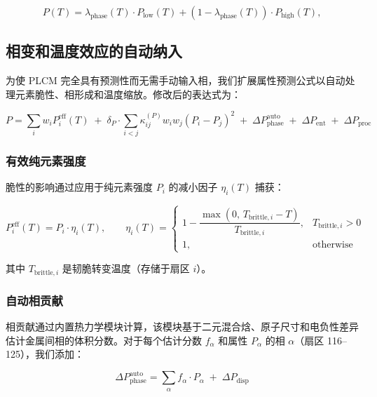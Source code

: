 \documentclass[12pt,a4paper]{article}
\begin{document}
	\begin{equation}
		P(T) = \lambda_{\text{phase}}(T) \cdot P_{\text{low}}(T) + (1-\lambda_{\text{phase}}(T)) \cdot P_{\text{high}}(T),
		\label{eq:phase-transition}
	\end{equation}
	
	\subsection{相变和温度效应的自动纳入}
	\label{subsec:auto-phase}
	
	为使 PLCM 完全具有预测性而无需手动输入相，我们扩展属性预测公式以自动处理元素脆性、相形成和温度缩放。修改后的表达式为：
	
	\begin{equation}
		\boxed{
			P = \sum_i w_i P_i^{\text{eff}}(T) \;+\; \delta_P \cdot \sum_{i<j} \kappa_{ij}^{(P)} w_i w_j (P_i - P_j)^2 \;+\; \Delta P_{\text{phase}}^{\text{auto}} \;+\; \Delta P_{\text{ent}} \;+\; \Delta P_{\text{proc}}
		}
		\label{eq:plcm-auto}
	\end{equation}
	
	\subsubsection{有效纯元素强度}
	脆性的影响通过应用于纯元素强度 \(P_i\) 的减小因子 \(\eta_i(T)\) 捕获：
	
	\begin{equation}
		P_i^{\text{eff}}(T) = P_i \cdot \eta_i(T), \qquad
		\eta_i(T) = 
		\begin{cases}
			1 - \dfrac{\max(0,\, T_{\text{brittle},i} - T)}{T_{\text{brittle},i}}, & T_{\text{brittle},i} > 0 \\
			1, & \text{otherwise}
		\end{cases}
	\end{equation}
	
	其中 \(T_{\text{brittle},i}\) 是韧脆转变温度（存储于扇区 \(i\)）。
	
	\subsubsection{自动相贡献}
	相贡献通过内置热力学模块计算，该模块基于二元混合焓、原子尺寸和电负性差异估计金属间相的体积分数。对于每个估计分数 \(f_{\alpha}\) 和属性 \(P_{\alpha}\) 的相 \(\alpha\)（扇区 116–125），我们添加：
	
	\begin{equation}
		\Delta P_{\text{phase}}^{\text{auto}} = \sum_{\alpha} f_{\alpha} \cdot P_{\alpha} \;+\; \Delta P_{\text{disp}}
	\end{equation}
	
\end{document}
